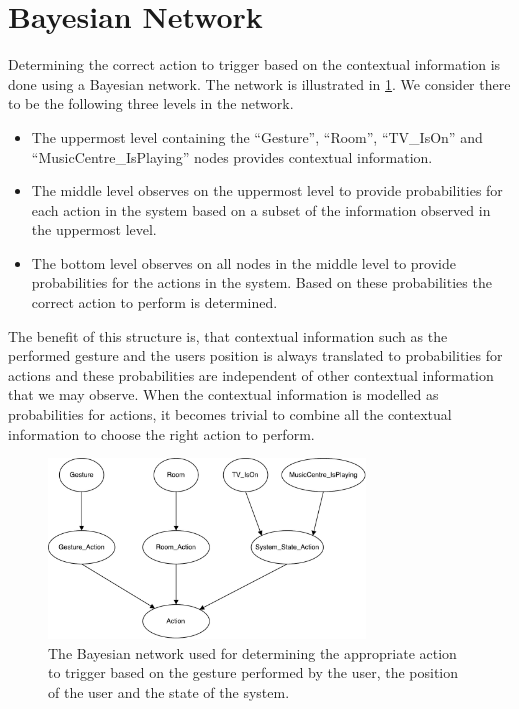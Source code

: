 \section{Bayesian Network}
\label{sec:design:bayesian-network}

Determining the correct action to trigger based on the contextual information is done using a Bayesian network. The network is illustrated in \cref{fig:design:bayesian-network:overview}. We consider there to be the following three levels in the network.

\begin{itemize}
\item The uppermost level containing the ``Gesture'', ``Room'', ``TV\_IsOn'' and ``MusicCentre\_IsPlaying'' nodes provides contextual information.
\item The middle level observes on the uppermost level to provide probabilities for each action in the system based on a subset of the information observed in the uppermost level.
\item The bottom level observes on all nodes in the middle level to provide probabilities for the actions in the system. Based on these probabilities the correct action to perform is determined.
\end{itemize}

The benefit of this structure is, that contextual information such as the performed gesture and the users position is always translated to probabilities for actions and these probabilities are independent of other contextual information that we may observe. When the contextual information is modelled as probabilities for actions, it becomes trivial to combine all the contextual information to choose the right action to perform.

\begin{figure}[h!]
\centering
\includegraphics[width=0.75\textwidth]{images/bayesian-network}
\caption{The Bayesian network used for determining the appropriate action to trigger based on the gesture performed by the user, the position of the user and the state of the system.}
\label{fig:design:bayesian-network:overview}
\end{figure}

